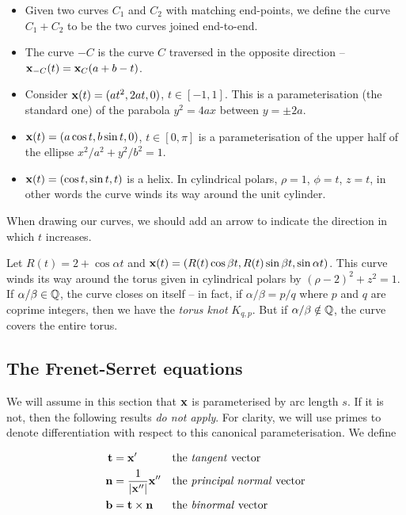 \documentclass{../template/note}
\begin{document}
    \begin{itemize}
        \item Given two curves \(C_1\) and \(C_2\) with matching end-points, we define the curve \(C_1 + C_2\) to be the two curves joined end-to-end.
        \item The curve \(-C\) is the curve \(C\) traversed in the opposite direction -- \(\V x_{-C}(t) = \V x_C(a+b-t)\).
    \end{itemize}
    
    \begin{example*}
        \begin{itemize}
            \item Consider \(\V x(t) = (at^2, 2at, 0)\), \(t \in [-1, 1]\). This is a parameterisation (the standard one) of the parabola \(y^2=4ax\) between \(y= \pm 2a\).
            \item \(\V x(t) = (a \cos t, b \sin t, 0)\), \(t \in [0, \pi]\) is a parameterisation of the upper half of the ellipse \(x^2/a^2+y^2/b^2=1\).
            \item \(\V x(t) = (\cos t, \sin t, t)\) is a helix. In cylindrical polars, \(\rho = 1\), \(\phi = t\), \(z = t\), in other words the curve winds its way around the unit cylinder.
        \end{itemize}
        When drawing our curves, we should add an arrow to indicate the direction in which \(t\) increases.
    \end{example*}
    
    \begin{example*}
        Let \(R(t) = 2 + \cos \alpha t\) and \(\V x(t) = (R(t) \cos \beta t, R(t) \sin \beta t, \sin \alpha t)\). This curve winds its way around the torus given in cylindrical polars by \((\rho-2)^2 + z^2 = 1\). If \(\alpha/\beta \in \mathbb Q\), the curve closes on itself -- in fact, if \(\alpha/\beta = p/q\) where \(p\) and \(q\) are coprime integers, then we have the \emph{torus knot} \(K_{q, p}\). But if \(\alpha/\beta \notin \mathbb Q\), the curve covers the entire torus.
    \end{example*}
    
    \subsection{The Frenet-Serret equations}

    We will assume in this section that \(\V x\) is parameterised by arc length \(s\). If it is not, then the following results \emph{do not apply}. For clarity, we will use primes to denote differentiation with respect to this canonical parameterisation. We define
    \begin{proposition}
        \begin{align*}
            \V t &= \V x' && \text{the \emph{tangent} vector} \\
            \V n &= \frac 1 {|\V x''|}\V x'' && \text{the \emph{principal normal} vector} \\
            \V b &= \V t \times \V n && \text{the \emph{binormal} vector}
        \end{align*}
    \end{proposition}
\end{document}
